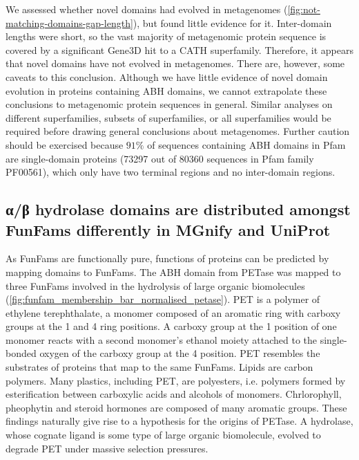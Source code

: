 We assessed whether novel domains had evolved in metagenomes (\ref{fig:not-matching-domains-gap-length}), but found little evidence for it. Inter-domain lengths were short, so the vast majority of metagenomic protein sequence is covered by a significant Gene$3$D hit to a CATH superfamily. Therefore, it appears that novel domains have not evolved in metagenomes. There are, however, some caveats to this conclusion. Although we have little evidence of novel domain evolution in proteins containing ABH domains, we cannot extrapolate these conclusions to metagenomic protein sequences in general. Similar analyses on different superfamilies, subsets of superfamilies, or all superfamilies would be required before drawing general conclusions about metagenomes. Further caution should be exercised because $91\%$ of sequences containing ABH domains in Pfam are single-domain proteins (\num{73297} out of \num{80360} sequences in Pfam family PF00561), which only have two terminal regions and no inter-domain regions.

\subsection{α/β hydrolase domains are distributed amongst FunFams differently in MGnify and UniProt}

As FunFams are functionally pure, functions of proteins can be predicted by mapping domains to FunFams. The ABH domain from PETase was mapped to three FunFams involved in the hydrolysis of large organic biomolecules (\ref{fig:funfam_membership_bar_normalised_petase}). PET is a polymer of ethylene terephthalate, a monomer composed of an aromatic ring with carboxy groups at the 1 and 4 ring positions. A carboxy group at the 1 position of one monomer reacts with a second monomer's ethanol moiety attached to the single-bonded oxygen of the carboxy group at the 4 position. PET resembles the substrates of proteins that map to the same FunFams. Lipids are carbon polymers. Many plastics, including PET, are polyesters, i.e. polymers formed by esterification between carboxylic acids and alcohols of monomers. Chrlorophyll, pheophytin and steroid hormones are composed of many aromatic groups. These findings naturally give rise to a hypothesis for the origins of PETase. A hydrolase, whose cognate ligand is some type of large organic biomolecule, evolved to degrade PET under massive selection pressures.

